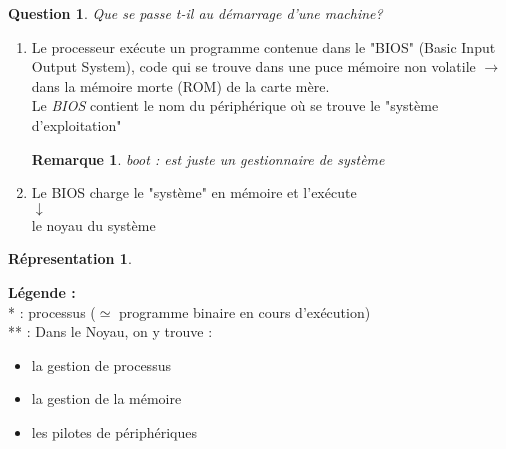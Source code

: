 \documentclass[12pt,a4paper]{report}
\newtheorem*{rem}{Remarque}
\newtheorem*{q}{Question}
\newtheorem*{schema}{Répresentation}
\begin{document}
\bigskip

\begin{q}
Que se passe t-il au démarrage d'une machine?
\end{q}
\smallskip
\begin{enumerate}
\item Le processeur exécute un programme contenue dans le "BIOS" (Basic Input Output System), code qui se trouve dans une puce mémoire non volatile $\rightarrow$ dans la mémoire morte (ROM) de la carte mère.\\
Le \emph{BIOS} contient le nom du périphérique où se trouve le "système d'exploitation"\\
\begin{rem}
boot : est juste un gestionnaire de système 
\end{rem}
\item Le BIOS charge le "système" en mémoire et l'exécute\\
\hspace*{3,5cm} $\downarrow$\\
\hspace*{3cm} le noyau du système
\end{enumerate}

\medskip

\begin{schema} \end{schema}
\begin{center}
\end{center}

\textbf{Légende :\\}
* : processus ($\simeq$ programme binaire en cours d'exécution)\\
** : Dans le Noyau, on y trouve :
\begin{itemize}
\item la gestion de processus
\item la gestion de la mémoire
\item les pilotes de périphériques
\end{itemize}
\end{document}
